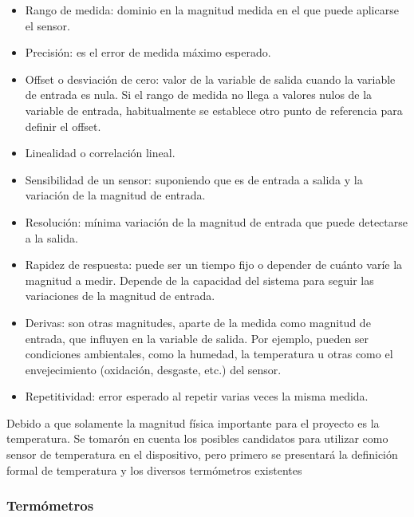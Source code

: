 \begin{itemize}
	
	\item Rango de medida: dominio en la magnitud medida en el que puede aplicarse el sensor.
	
	\item Precisión: es el error de medida máximo esperado.
	
	\item Offset o desviación de cero:  valor de la variable de salida cuando la variable de entrada es nula. Si el rango de medida no llega a valores nulos de la variable de entrada, habitualmente se establece otro punto de referencia para definir el offset.
	
	\item Linealidad o correlación lineal.
	
	\item Sensibilidad de un sensor: suponiendo que es de entrada a salida y la variación de la magnitud de entrada.
	
	\item Resolución: mínima variación de la magnitud de entrada que puede detectarse a la salida.
	
	\item Rapidez de respuesta: puede ser un tiempo fijo o depender de cuánto varíe la magnitud a medir. Depende de la capacidad del sistema para seguir las variaciones de la magnitud de entrada.
	
	\item Derivas: son otras magnitudes, aparte de la medida como magnitud de entrada, que influyen en la variable de salida. Por ejemplo, pueden ser condiciones ambientales, como la humedad, la temperatura u otras como el envejecimiento (oxidación, desgaste, etc.) del sensor.
	
	\item Repetitividad: error esperado al repetir varias veces la misma medida.\cite{sensores-wiki}
	
\end{itemize}

\par \noindent
Debido a que solamente la magnitud física importante para el proyecto es la temperatura. Se tomarón en cuenta los posibles candidatos para utilizar como sensor de temperatura en el dispositivo, pero primero se presentará la definición formal de temperatura y los diversos termómetros existentes

\subsubsection{Termómetros}

